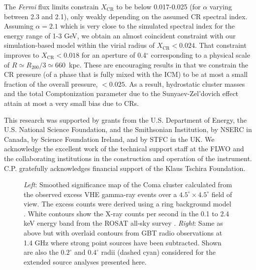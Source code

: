 \documentclass[12pt,manuscript]{aastex}
\newcommand{\CR}{\mathrm{CR}}
\begin{document}
The {\em Fermi} flux limits constrain $X_\CR$ to be below 0.017-0.025 (for $\alpha$ varying
between 2.3 and 2.1), only weakly depending on the assumed CR spectral index. Assuming $\alpha=2.1$
which is very close to the simulated spectral index for the energy range of 1-3 GeV, we obtain an
almost coincident constraint with our simulation-based model within the virial radius of
$X_\CR<0.024$. That constraint improves to $X_{\CR}<0.018$ for an aperture of 0.4$^\circ$
corresponding to a physical scale of $R \simeq R_{200}/3 \simeq 660$~kpc. These are encouraging
results in that we constrain the CR pressure (of a phase that is fully mixed with the ICM) to be at
most a small fraction of the overall pressure, $<0.025$. As a result, hydrostatic cluster masses
and the total Comptonization parameter due to the Sunyaev-Zel'dovich effect attain at most a very
small bias due to CRs.

\acknowledgments
This research was supported by grants from the U.S. Department of Energy, the U.S. National Science
Foundation, and the Smithsonian Institution, by NSERC in Canada, by Science Foundation Ireland, and
by STFC in the UK. We acknowledge the excellent work of the technical support staff at the FLWO and
the collaborating institutions in the construction and operation of the instrument. C.P. gratefully
acknowledges financial support of the Klaus Tschira Foundation.





\begin{figure*}
\begin{center}
\end{center}
\caption{\emph{Left}: Smoothed significance map of the Coma cluster calculated from the observed
excess VHE gamma-ray events over a $4.5^{\circ}\times 4.5^{\circ}$ field of view. The excess counts
were derived using a ring background model \citep{article:Aharonian_etal:2001}. White contours show
the X-ray counts per second in the 0.1 to 2.4 keV energy band from the ROSAT all-sky survey
\citep{article:BrielHenryBohringer:1992}. \emph{Right}: Same as above but with overlaid contours
from GBT radio observations at 1.4 GHz \citep{article:BrownRudnick:2010} where strong point sources
have been subtracted. Shown are also the $0.2^{\circ}$ and $0.4^{\circ}$ radii (dashed cyan)
considered for the extended source analyses presented here.}
\label{fig:skymaps}
\end{figure*}
\end{document}
